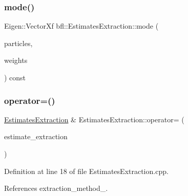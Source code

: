 \mbox{\label{classbfl_1_1EstimatesExtraction_a6026cb6d03eae12a3af66be4b935878b}} 
\subsubsection{\texorpdfstring{mode()}{mode()}}
{\footnotesize\ttfamily Eigen\+::\+Vector\+Xf bfl\+::\+Estimates\+Extraction\+::mode (\begin{DoxyParamCaption}\item[{const Eigen\+::\+Ref$<$ const Eigen\+::\+Matrix\+Xf $>$ \&}]{particles,  }\item[{const Eigen\+::\+Ref$<$ const Eigen\+::\+Vector\+Xf $>$ \&}]{weights }\end{DoxyParamCaption}) const\hspace{0.3cm}{\ttfamily [protected]}}

\mbox{\label{classbfl_1_1EstimatesExtraction_ae473904953c7ad90408da2b4d3c14a1a}} 
\subsubsection{\texorpdfstring{operator=()}{operator=()}}
{\footnotesize\ttfamily \mbox{\hyperlink{classbfl_1_1EstimatesExtraction}{Estimates\+Extraction}} \& Estimates\+Extraction\+::operator= (\begin{DoxyParamCaption}\item[{\mbox{\hyperlink{classbfl_1_1EstimatesExtraction}{Estimates\+Extraction}} \&\&}]{estimate\+\_\+extraction }\end{DoxyParamCaption})\hspace{0.3cm}{\ttfamily [noexcept]}}



Definition at line 18 of file Estimates\+Extraction.\+cpp.



References extraction\+\_\+method\+\_\+.

\mbox{\label{classbfl_1_1EstimatesExtraction_a68bb4f3b41f578a38d9847b9c140c130}} 
